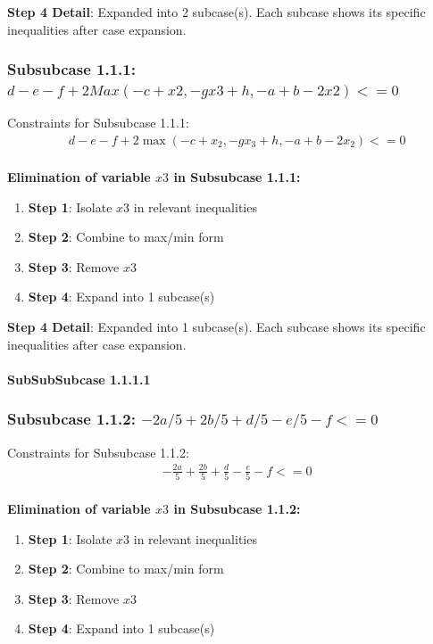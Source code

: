 \documentclass{article}
\begin{document}
\textbf{Step 4 Detail}: Expanded into 2 subcase(s).
Each subcase shows its specific inequalities after case expansion.

\subsubsection{Subsubcase 1.1.1: $d - e - f + 2 Max(-c + x2, -g x3 + h, -a + b - 2 x2) <= 0$}

Constraints for Subsubcase 1.1.1:
\begin{align}
& d - e - f + 2 \max\left(- c + x_{2}, - g x_{3} + h, - a + b - 2 x_{2}\right) <= 0 \\
\end{align}

\textbf{Elimination of variable $x3$ in Subsubcase 1.1.1:}

\begin{enumerate}
\item \textbf{Step 1}: Isolate $x3$ in relevant inequalities
\item \textbf{Step 2}: Combine to max/min form
\item \textbf{Step 3}: Remove $x3$
\item \textbf{Step 4}: Expand into 1 subcase(s)
\end{enumerate}

\textbf{Step 4 Detail}: Expanded into 1 subcase(s).
Each subcase shows its specific inequalities after case expansion.

\paragraph{SubSubSubcase 1.1.1.1}

\subsubsection{Subsubcase 1.1.2: $-2 a/5 + 2 b/5 + d/5 - e/5 - f <= 0$}

Constraints for Subsubcase 1.1.2:
\begin{align}
& - \frac{2 a}{5} + \frac{2 b}{5} + \frac{d}{5} - \frac{e}{5} - f <= 0 \\
\end{align}

\textbf{Elimination of variable $x3$ in Subsubcase 1.1.2:}

\begin{enumerate}
\item \textbf{Step 1}: Isolate $x3$ in relevant inequalities
\item \textbf{Step 2}: Combine to max/min form
\item \textbf{Step 3}: Remove $x3$
\item \textbf{Step 4}: Expand into 1 subcase(s)
\end{enumerate}
\end{document}

